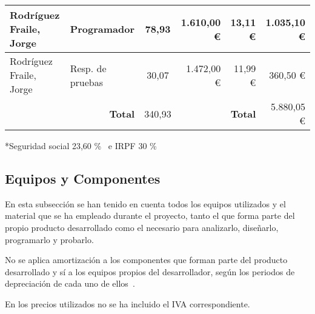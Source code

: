 \begin{table}[H]
{\begin{tabular}{ll|c|rr|r|}
			\multicolumn{1}{|l|}{Rodríguez Fraile, Jorge}                             & Programador                                                 & 78,93                                   & \multicolumn{1}{r|}{1.610,00 €}                              & 13,11 €                                                                              & 1.035,10 €                                                                           \\ \hline
			\multicolumn{1}{|l|}{Rodríguez Fraile, Jorge}                             & Resp. de pruebas                                            & 30,07                                   & \multicolumn{1}{r|}{1.472,00 €}                              & 11,99 €                                                                              & 360,50   €                                                                           \\ \hline
			                                                                          & \multicolumn{1}{r|}{\textbf{Total}}                         & 340,93                                  & \multicolumn{1}{l}{}                                         & \textbf{Total}                                                                       & 5.880,05 €                                                                           \\ \cline{3-3} \cline{6-6}
		\end{tabular}%
	}
\end{table}
\vspace{-.6cm}
*Seguridad social 23,60 \%~\cite{ministerio_de_inclusion_seguridad_social_y_migraciones_bases_nodate} e IRPF 30 \%~\cite{trecet_irpf_nodate}

\subsection{Equipos y Componentes}\label{subsec:equipos-y-componentes}
En esta subsección se han tenido en cuenta todos los equipos utilizados y el material que se ha empleado durante el proyecto, tanto el que forma parte del propio producto desarrollado como el necesario para analizarlo, diseñarlo, programarlo y probarlo.

No se aplica amortización a los componentes que forman parte del producto desarrollado y sí a los equipos propios del desarrollador, según los periodos de depreciación de cada uno de ellos~\cite{thiebaud_-muller_service_2018}.

En los precios utilizados no se ha incluido el IVA correspondiente.

